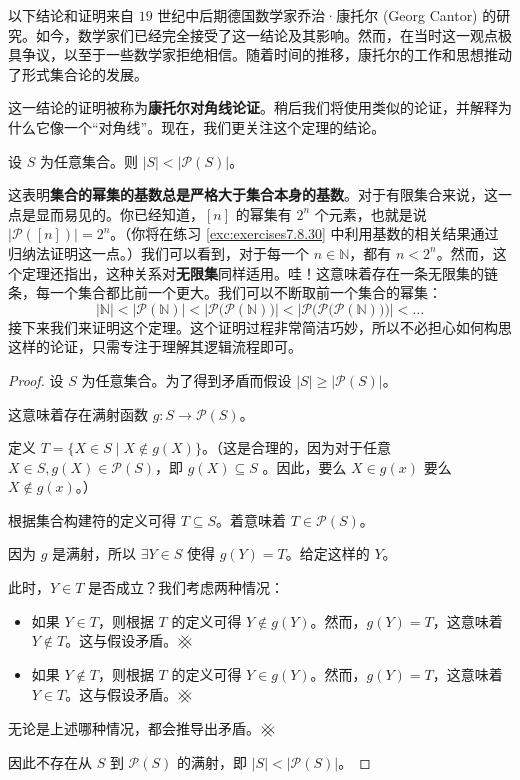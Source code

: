 以下结论和证明来自 $19$ 世纪中后期德国数学家乔治·康托尔 (Georg Cantor) 的研究。如今，数学家们已经完全接受了这一结论及其影响。然而，在当时这一观点极具争议，以至于一些数学家拒绝相信。随着时间的推移，康托尔的工作和思想推动了形式集合论的发展。

这一结论的证明被称为\textbf{康托尔对角线论证}。稍后我们将使用类似的论证，并解释为什么它像一个``对角线''。现在，我们更关注这个定理的结论。

\begin{theorem}
    设 $S$ 为任意集合。则 $|S| < |\mathcal{P}(S)|$。
\end{theorem}

这表明\textbf{集合的幂集的基数总是严格大于集合本身的基数}。对于有限集合来说，这一点是显而易见的。你已经知道，$[n]$ 的幂集有 $2^n$ 个元素，也就是说 $|\mathcal{P}([n])| = 2^n$。（你将在练习 \ref{exc:exercises7.8.30} 中利用基数的相关结果通过归纳法证明这一点。）我们可以看到，对于每一个 $n \in \mathbb{N}$，都有 $n < 2^n$。然而，这个定理还指出，这种关系对\textbf{无限集}同样适用。哇！这意味着存在一条无限集的链条，每一个集合都比前一个更大。我们可以不断取前一个集合的幂集：
\[|\mathbb{N}| < |\mathcal{P}(\mathbb{N})| < \big|\mathcal{P}\big(\mathcal{P}(\mathbb{N})\big)\big| < \Big|\mathcal{P}\Big(\mathcal{P}\big(\mathcal{P}(\mathbb{N})\big)\Big)\Big| < \dots
\]
接下来我们来证明这个定理。这个证明过程非常简洁巧妙，所以不必担心如何构思这样的论证，只需专注于理解其逻辑流程即可。

\begin{proof}
    设 $S$ 为任意集合。为了得到矛盾而假设 $|S| \ge |\mathcal{P}(S)|$。

    这意味着存在满射函数 $g : S \to \mathcal{P}(S)$。

    定义 $T = \{X \in S \mid X \notin g(X)\}$。（这是合理的，因为对于任意 $X \in S, g(X) \in \mathcal{P}(S)$，即 $g(X) \subseteq S$ 。因此，要么 $X \in g(x)$ 要么 $X \notin g(x)$。）

    根据集合构建符的定义可得 $T \subseteq S$。着意味着 $T \in \mathcal{P}(S)$。

    因为 $g$ 是满射，所以 $\exists Y \in S$ 使得 $g(Y) = T$。给定这样的 $Y$。

    此时，$Y \in T$ 是否成立？我们考虑两种情况：
    \begin{itemize}
        \item 如果 $Y \in T$，则根据 $T$ 的定义可得 $Y \notin g(Y)$。然而，$g(Y) = T$，这意味着 $Y \notin T$。这与假设矛盾。$\hashx$
        \item 如果 $Y \notin T$，则根据 $T$ 的定义可得 $Y \in g(Y)$。然而，$g(Y) = T$，这意味着 $Y \in T$。这与假设矛盾。$\hashx$
    \end{itemize}
    无论是上述哪种情况，都会推导出矛盾。$\hashx$

    因此不存在从 $S$ 到 $\mathcal{P}(S)$ 的满射，即 $|S| < |\mathcal{P}(S)|$。
\end{proof}

